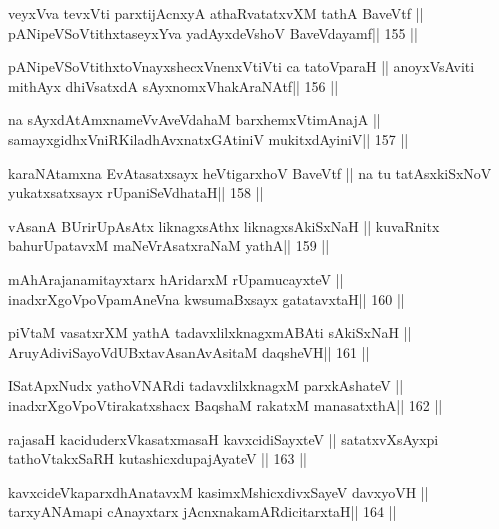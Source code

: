 \begin{shl}
veyxVva tevxVti parxtijAcnxyA athaRvatatxvXM tathA BaveVtf ||
pANipeVSoVtithxtaseyxYva yadAyxdeVshoV BaveVdayamf\hfill || 155 ||
\end{shl}

\begin{shl}
pANipeVSoVtithxtoV\s nayxshecxVnenxVtiVti ca tatoV\s paraH ||
anoyxV\s sAviti mithAyx dhiVsatxdA sAyxnomxVhakAraNAtf\hfill || 156 ||
\end{shl}

\begin{shl}
na sAyxdAtAmxnameVvAveVdahaM barxhemxVtimAnajA ||
samayxgidhxVniRKiladhAvxnatxGAtiniV mukitxdAyiniV\hfill || 157 ||
\end{shl}

\begin{shl}
karaNAtamxna EvAtasatxsayx heVtigarxhoV BaveVtf ||
na tu tatAsxkiSxNoV yukatxsatxsayx rUpaniSeVdhataH\hfill || 158 ||
\end{shl}

\begin{shl}
vAsanA BUrirUpAsAtx liknagxsAthx liknagxsAkiSxNaH ||
kuvaRnitx bahurUpatavxM maNeVrAsatxraNaM yathA\hfill || 159 ||
\end{shl}

\begin{shl}
mAhArajanamitayxtarx hAridarxM rUpamucayxteV ||
inadxrXgoVpoVpamAneVna kwsumaBxsayx gatatavxtaH\hfill || 160 ||
\end{shl}

\begin{shl}
piVtaM vasatxrXM yathA tadavxlilxknagxmABAti sAkiSxNaH ||
AruyAdiviSayoVdUBxtavAsanAvAsitaM daqsheVH\hfill || 161 ||
\end{shl}

\begin{shl}
ISatApxNudx yathoVNARdi tadavxlilxknagxM parxkAshateV ||
inadxrXgoVpoV\s tirakatxshacx BaqshaM rakatxM manasatxthA\hfill || 162 ||
\end{shl}

\begin{shl}
rajasaH kaciduderxVkasatxmasaH kavxcidiSayxteV ||
satatxvXsAyxpi tathoVtakxSaRH kutashicxdupajAyateV ||  163 ||
\end{shl}

\begin{shl}
kavxcideVkaparxdhAnatavxM kasimxMshicxdivxSayeV davxyoVH ||
tarxyANAmapi cAnayxtarx jAcnxnakamARdicitarxtaH\hfill || 164 ||
\end{shl}

